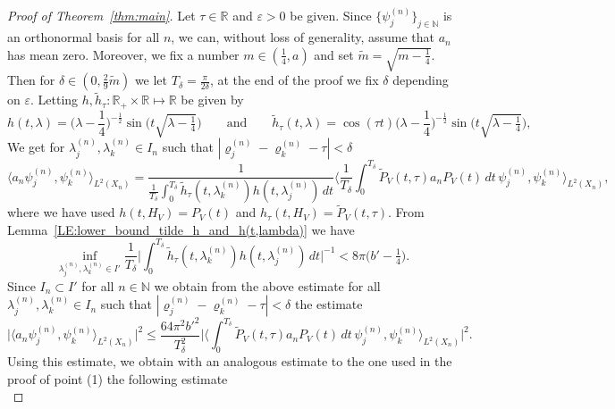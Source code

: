 \documentclass[11pt,twoside,reqno]{amsart}
\newcommand{\R}{\mathbb{R}}
\newcommand{\N}{\mathbb{N}}
\renewcommand{\rho}{\varrho}
\newcommand{\1}{\mathrm{\mathbf{1}}}
\numberwithin{equation}{section}
\theoremstyle{plain}
\theoremstyle{definition}
\theoremstyle{remark}
\begin{document}
\begin{proof}[Proof of Theorem~\ref{thm:main}]
Let $\tau\in\R$ and $\varepsilon>0$ be given. Since $\{\psi_j^{(n)}\}_{j\in\N}$ is an orthonormal basis for all $n$, we can, without loss of generality, assume that $a_n$ has mean zero. Moreover, we fix a number $m\in(\frac14,a)$ and set $\widetilde{m} = \sqrt{m-\frac14}$. Then for $\delta \in (0,\frac29\widetilde{m})$ we let $T_\delta = \frac{\pi}{2\delta}$, at the end of the proof we fix $\delta$ depending on $\varepsilon$.  
Letting $h,\tilde{h}_\tau:\R_+\times\R\mapsto\R$ be given by 
\begin{equation*}
    h(t,\lambda) = \big(\lambda - \frac{1}{4}\big)^{-\frac12}\sin\big(t\sqrt{\lambda - \tfrac{1}{4}}\big) \qquad\text{and}\qquad \tilde{h}_\tau(t,\lambda) = \cos(\tau t) \big(\lambda - \frac{1}{4}\big)^{-\frac12}\sin\big(t\sqrt{\lambda - \tfrac{1}{4}}\big),
\end{equation*}    
We get for $\lambda_j^{(n)},\lambda_k^{(n)} \in I_n$ such that $|\rho_j^{(n)}-\rho_k^{(n)}-\tau|<\delta$
%
\begin{equation*}
      \langle a_n \psi_j^{(n)} , \psi_k^{(n)}\rangle_{L^2(X_n)} = \frac{1}{\frac{1}{T_\delta} \int_0^{T_\delta} \tilde{h}_\tau(t,\lambda_{k}^{(n)}) h(t,\lambda_{j}^{(n)}) \, d t }  \langle \frac{1}{T_\delta} \int_{0}^{T_\delta} \widetilde{P}_V(t,\tau) a_n P_V(t) \, d t \, \psi_j^{(n)} , \psi_k^{(n)}\rangle_{L^2(X_n)},  
\end{equation*}
where we have used $h(t,H_V) = P_V(t)$ and $ h_\tau(t,H_V) = \widetilde{P}_V(t,\tau)$. From Lemma~\ref{LE:lower_bound_tilde_h_and_h(t,lambda)} we have
\begin{equation*}
    \inf_{\lambda_j^{(n)},\lambda_k^{(n)} \in I'} \frac{1}{T_\delta} \Big| \int_0^{T_\delta} \tilde{h}_\tau(t,\lambda_{k}^{(n)}) h(t,\lambda_{j}^{(n)}) \, d t \Big|^{-1} < 8\pi\big(b'-\tfrac{1}{4}\big).
\end{equation*}
Since $I_n\subset I'$ for all $n\in\N$ we obtain from the above estimate for all $\lambda_j^{(n)},\lambda_k^{(n)} \in I_n$ such that $|\rho_j^{(n)}-\rho_k^{(n)}-\tau|<\delta$ the estimate
\begin{equation*}
      \big|\langle a_n \psi_j^{(n)} , \psi_k^{(n)}\rangle_{L^2(X_n)}\big|^2 \leq \frac{64\pi^2 b'^2}{T_\delta^2} \Big|  \langle \int_{0}^{T_\delta} \widetilde{P}_V(t,\tau) a_n P_V(t) \, d t \, \psi_j^{(n)} , \psi_k^{(n)}\rangle_{L^2(X_n)} \Big|^2.  
\end{equation*}
Using this estimate, we obtain with an analogous estimate to the one used in the proof of point (1) the following estimate
\begin{equation*}

\end{equation*}
\end{proof}
\end{document}
